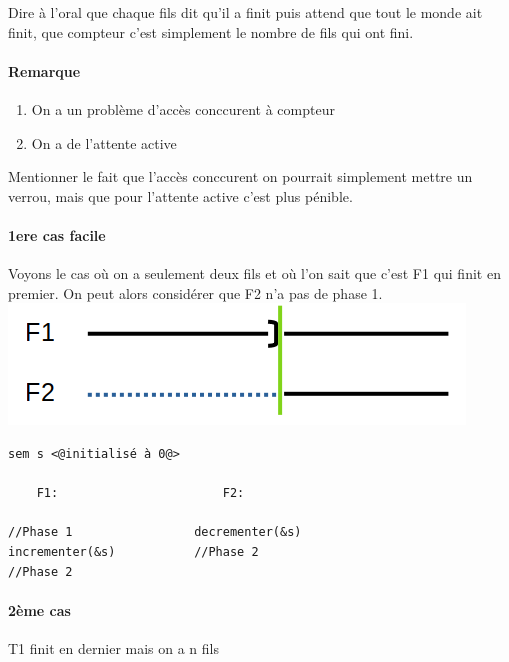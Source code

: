 \begin{minipage}{0.5\linewidth}
	\begin{com}
		Dire à l'oral que chaque fils dit qu'il a finit puis attend que tout le monde ait finit, que compteur c'est simplement le nombre de fils qui ont fini.
	\end{com}
\end{minipage}

\paragraph{Remarque}\begin{enumerate}
	\item On a un problème d'accès conccurent à compteur
	\item On a de l'attente active
\end{enumerate}

\begin{com}
	Mentionner le fait que l'accès conccurent on pourrait simplement mettre un verrou, mais que pour l'attente active c'est plus pénible.
\end{com}

\paragraph{1ere cas facile} Voyons le cas où on a seulement deux fils et où l'on sait que c'est F1 qui finit en premier. On peut alors considérer que F2 n'a pas de phase 1.\\

\includegraphics[scale=0.5]{Developpements/probleme du rdv/premier_cas.png}\\

\begin{lstlisting}
sem s <@initialisé à 0@>

    F1:                       F2:
                               
//Phase 1                 decrementer(&s)
incrementer(&s)           //Phase 2
//Phase 2
\end{lstlisting}

\paragraph{2ème cas} T1 finit en dernier mais on a n fils\\

